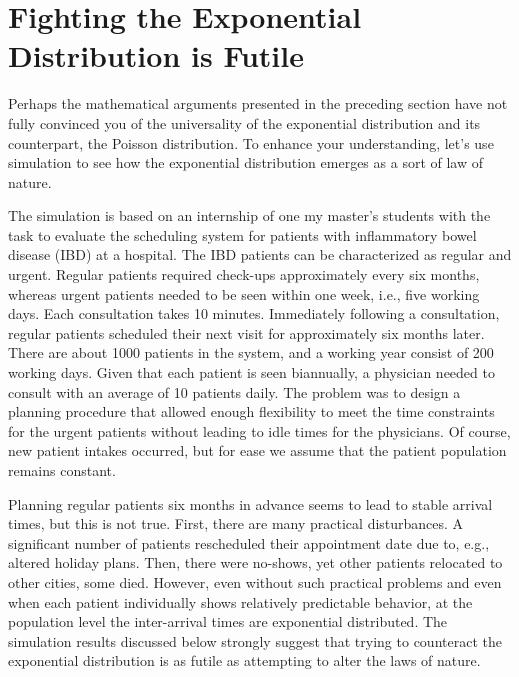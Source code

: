 \documentclass[stochastic-or.tex]{subfiles}
\begin{document}
\section{Fighting the Exponential Distribution is Futile}
\label{sec:fight-expon-distr}

Perhaps the mathematical arguments presented in the preceding section have not fully convinced you of the universality of the exponential distribution and its counterpart, the Poisson distribution.
To enhance your understanding, let's use simulation to see how the exponential distribution emerges as a sort of law of nature.

The simulation is based on an internship of one my master's students with the task to evaluate the scheduling system for patients with inflammatory bowel disease (IBD) at a hospital.
The IBD patients can be characterized as regular and urgent.
Regular patients required check-ups approximately every six months, whereas urgent patients needed to be seen within one week, i.e., five working days.
Each consultation takes 10 minutes.
Immediately following a consultation, regular patients scheduled their next visit for approximately six months later.
There are about 1000 patients in the system, and a working year consist of 200 working days.
Given that each patient is seen biannually, a physician needed to consult with an average of 10 patients daily.
The problem was to design a planning procedure that allowed enough flexibility to meet the time constraints for the urgent patients without leading to idle times for the physicians.
Of course, new patient intakes occurred, but for ease we assume that the patient population remains constant.

Planning regular patients six months in advance seems to lead to stable arrival times, but this is not true.
First, there are many practical disturbances.
A significant number of patients rescheduled their appointment date due to, e.g., altered holiday plans.
Then, there were no-shows, yet other patients relocated to other cities, some died.
However, even without such practical problems and even when each patient individually shows relatively predictable behavior, at the population level the inter-arrival times are exponential distributed.
The simulation results discussed below strongly suggest that trying to counteract the exponential distribution is as futile as attempting to alter the laws of nature.
\end{document}
